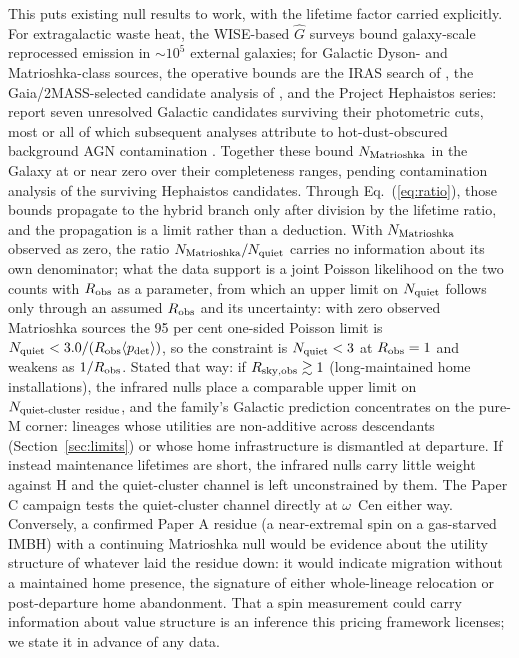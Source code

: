 \documentclass[11pt]{article}
\begin{document}
This puts existing null results to work, with the lifetime factor carried explicitly. For extragalactic waste heat, the WISE-based $\hat{G}$ surveys \citep{Wright2014,Griffith2015} bound galaxy-scale reprocessed emission in $\sim$$10^{5}$ external galaxies; for Galactic Dyson- and Matrioshka-class sources, the operative bounds are the IRAS search of \citet{Carrigan2009}, the Gaia/2MASS-selected candidate analysis of \citet{Zackrisson2018}, and the Project Hephaistos series: \citet{Suazo2024} report seven unresolved Galactic candidates surviving their photometric cuts, most or all of which subsequent analyses attribute to hot-dust-obscured background AGN contamination \citep{Ren2024,Blain2024,Ren2025}. Together these bound $N_{\rm Matrioshka}$ in the Galaxy at or near zero over their completeness ranges, pending contamination analysis of the surviving Hephaistos candidates. Through Eq.~(\ref{eq:ratio}), those bounds propagate to the hybrid branch only after division by the lifetime ratio, and the propagation is a limit rather than a deduction. With $N_{\rm Matrioshka}$ observed as zero, the ratio $N_{\rm Matrioshka}/N_{\rm quiet}$ carries no information about its own denominator; what the data support is a joint Poisson likelihood on the two counts with $R_{\rm obs}$ as a parameter, from which an upper limit on $N_{\rm quiet}$ follows only through an assumed $R_{\rm obs}$ and its uncertainty: with zero observed Matrioshka sources the 95 per cent one-sided Poisson limit is $N_{\rm quiet} < 3.0/(R_{\rm obs}\langle p_{\rm det}\rangle)$, so the constraint is $N_{\rm quiet} < 3$ at $R_{\rm obs} = 1$ and weakens as $1/R_{\rm obs}$. Stated that way: if $R_{\rm sky,obs} \gtrsim 1$ (long-maintained home installations), the infrared nulls place a comparable upper limit on $N_{\rm quiet\mathchar`-cluster\ residue}$, and the family's Galactic prediction concentrates on the pure-M corner: lineages whose utilities are non-additive across descendants (Section~\ref{sec:limits}) or whose home infrastructure is dismantled at departure. If instead maintenance lifetimes are short, the infrared nulls carry little weight against H and the quiet-cluster channel is left unconstrained by them. The Paper C campaign tests the quiet-cluster channel directly at $\omega$~Cen either way. Conversely, a confirmed Paper A residue (a near-extremal spin on a gas-starved IMBH) with a continuing Matrioshka null would be evidence about the utility structure of whatever laid the residue down: it would indicate migration without a maintained home presence, the signature of either whole-lineage relocation or post-departure home abandonment. That a spin measurement could carry information about value structure is an inference this pricing framework licenses; we state it in advance of any data.
\end{document}
